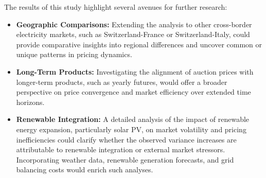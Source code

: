 \documentclass[12pt]{article}
\begin{document}
The results of this study highlight several avenues for further research:
\begin{itemize}
    \item \textbf{Geographic Comparisons:} Extending the analysis to other cross-border electricity markets, such as Switzerland-France or Switzerland-Italy, could provide comparative insights into regional differences and uncover common or unique patterns in pricing dynamics.
    \item \textbf{Long-Term Products:} Investigating the alignment of auction prices with longer-term products, such as yearly futures, would offer a broader perspective on price convergence and market efficiency over extended time horizons.
    \item \textbf{Renewable Integration:} A detailed analysis of the impact of renewable energy expansion, particularly solar PV, on market volatility and pricing inefficiencies could clarify whether the observed variance increases are attributable to renewable integration or external market stressors. Incorporating weather data, renewable generation forecasts, and grid balancing costs would enrich such analyses.
\end{itemize}

\newpage


\end{document}
